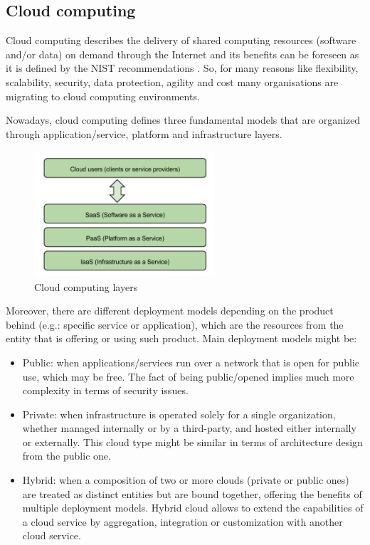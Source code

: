 \subsection{Cloud computing}

Cloud computing describes the delivery of shared computing resources (software and/or data) on demand through the Internet and its benefits can be foreseen as it is defined by the NIST recommendations \cite{nistcc}. So, for many reasons like flexibility, scalability, security, data protection, agility and cost many organisations are migrating to cloud computing environments. 

Nowadays, cloud computing defines three fundamental models that are organized through application/service, platform and infrastructure layers.

\begin{figure}[htb]
\begin{center}
\includegraphics[width=0.6\textwidth]{./images/Cloud_computing_layers.png}
\caption{Cloud computing layers}
\label{F:cloudComputingLayers}
\end{center}
\end{figure}

Moreover, there are different deployment models depending on the product behind (e.g.: specific service or application), which are the resources from the entity that is offering or using such product. Main deployment models might be:

\begin{itemize}
\item Public: when applications/services run over a network that is open for public use, which may be free. The fact of being public/opened implies much more complexity in terms of security issues.
\item Private: when infrastructure is operated solely for a single organization, whether managed internally or by a third-party, and hosted either internally or externally. This cloud type might be similar in terms of architecture design from the public one.
\item Hybrid: when a composition of two or more clouds (private or public ones) are treated as distinct entities but are bound together, offering the benefits of multiple deployment models. Hybrid cloud allows to extend the capabilities of a cloud service by aggregation, integration or customization with another cloud service.
\end{itemize}

